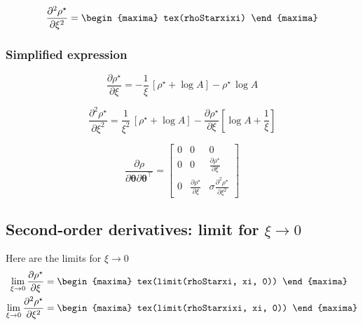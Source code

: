 {\color{MonVertF}
\[
\frac{\partial^2 \rho^\star}{\partial \xi^2} = 
\begin{maxima}
  tex(rhoStarxixi)
\end{maxima}
\]}

\subsubsection*{Simplified expression}
{\color{red}
$$
\frac{\partial \rho^\star}{\partial \xi} =
- \frac{1}{\xi}\, \left[ \rho^\star + \log A \right] - \rho^\star \, \log A
$$
}

{\color{red}
$$
\frac{\partial^2 \rho^\star}{\partial \xi^2} = \frac{1}{\xi^2} \,
\left[ \rho^\star + \log A \right]
  - \frac{\partial \rho^\star}{\partial \xi} \left[ \log A + \frac{1}{\xi} \right]
$$
}

$$
\frac{\partial \rho}{\partial \boldsymbol{\theta}\partial \boldsymbol{\theta}^\top} =
\begin{bmatrix}
  0 & 0 & 0 \\
  0 & 0 & \frac{\partial \rho^\star}{\partial \xi}\\
  0 & \frac{\partial \rho^\star}{\partial \xi} &
  \sigma \frac{\partial^2 \rho^\star}{\partial \xi^2}
\end{bmatrix}
$$

\subsection{Second-order derivatives: limit for $\xi \to 0$}
Here are the limits for $\xi \to 0$
{\color{MonVertF}
\begin{align*}
  \lim_{\xi \to 0} \frac{\partial \rho^\star}{\partial \xi}
  &=
    \begin{maxima}
      tex(limit(rhoStarxi, xi, 0))
    \end{maxima}
  \\
   \lim_{\xi \to 0} \frac{\partial^2 \rho^\star}{\partial \xi^2}
  &=
    \begin{maxima}
      tex(limit(rhoStarxixi, xi, 0))
    \end{maxima}
\end{align*}}
